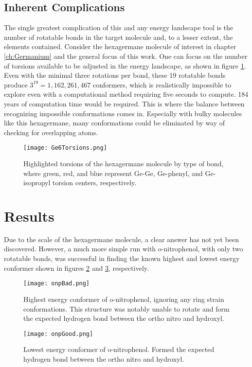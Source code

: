\subsection{Inherent Complications}

The single greatest complication of this and any energy landscape tool is the number of rotatable bonds in the target molecule and, to a lesser extent, the elements contained.
Consider the hexagermane molecule of interest in chapter \ref{ch:Germanium} and the general focus of this work.
One can focus on the number of torsions available to be adjusted in the energy landscape, as shown in figure \ref{fig:Ge6Torsions}. 
Even with the minimal three rotations per bond, these 19 rotatable bonds produce $3^{19} = 1,162,261,467$ conformers, which is realistically impossible to explore even with a computational method requiring five seconds to compute.
184 years of computation time would be required.
This is where the balance between recognizing impossible conformations comes in.
Especially with bulky molecules like this hexagermane, many conformations could be eliminated by way of checking for overlapping atoms.

\begin{figure}
	\centering 
	\texttt{[image: Ge6Torsions.png]}
	\caption{Highlighted torsions of the hexagermane molecule by type of bond, where green, red, and blue represent Ge-Ge, Ge-phenyl, and Ge-isopropyl torsion centers, respectively.}
	\label{fig:Ge6Torsions}
\end{figure}


\section{Results}

Due to the scale of the hexagermane molecule, a clear answer has not yet been discovered.
However, a much more simple run with o-nitrophenol, with only two rotatable bonds, was successful in finding the known highest and lowest energy conformer shown in figures \ref{fig:onpBad} and \ref{fig:onpGood}, respectively.

\begin{figure}
	\centering 
	\texttt{[image: onpBad.png]}
	\caption{Highest energy conformer of o-nitrophenol, ignoring any ring strain conformations. This structure was notably unable to rotate and form the expected hydrogen bond between the ortho nitro and hydroxyl.}
	\label{fig:onpBad}
\end{figure}
\begin{figure}
	\centering 
	\texttt{[image: onpGood.png]}
	\caption{Lowest energy conformer of o-nitrophenol. Formed the expected hydrogen bond between the ortho nitro and hydroxyl.}
	\label{fig:onpGood}
\end{figure}

